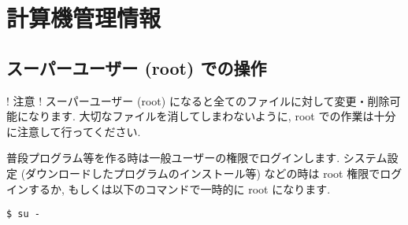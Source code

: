 \documentclass{jarticle}
\begin{document}








\section{計算機管理情報}

\subsection{スーパーユーザー (root) での操作}

! 注意 ! スーパーユーザー (root) になると全てのファイルに対して変更・削除可能になります.
大切なファイルを消してしまわないように, root での作業は十分に注意して行ってください.

普段プログラム等を作る時は一般ユーザーの権限でログインします.
システム設定 (ダウンロードしたプログラムのインストール等) などの時は root
権限でログインするか, もしくは以下のコマンドで一時的に root になります.
\begin{verbatim}
$ su -
\end{verbatim}
\end{document}

